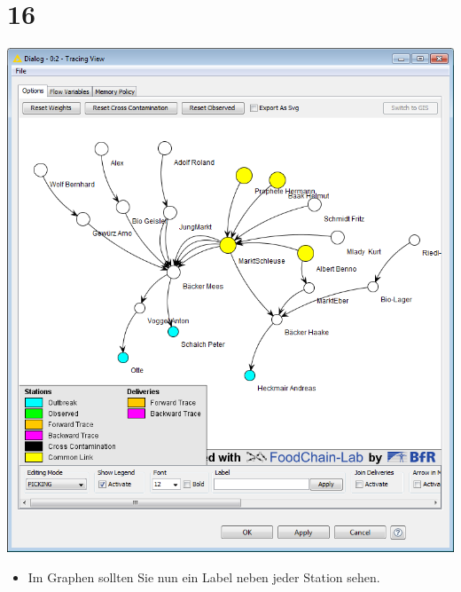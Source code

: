 \documentclass{beamer}
\begin{document}
\section{16}
\begin{frame}
	\begin{center}
  		\includegraphics[height=0.6\textheight]{16.png}
	\end{center}
	\begin{itemize}
		\item Im Graphen sollten Sie nun ein Label neben jeder Station sehen.
	\end{itemize}
\end{frame}
\end{document}
